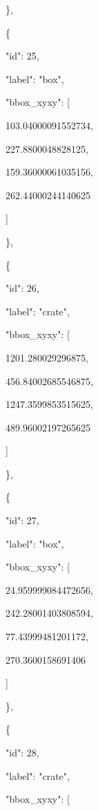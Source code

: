 \documentclass[10pt,a4paper]{article}
\begin{document}
    \},\allowbreak{}\par
    \{\par
      "id":\allowbreak{} 25,\allowbreak{}\par
      "label":\allowbreak{} "box",\allowbreak{}\par
      "bbox\_xyxy":\allowbreak{} [\par
        103.04000091552734,\allowbreak{}\par
        227.8800048828125,\allowbreak{}\par
        159.36000061035156,\allowbreak{}\par
        262.44000244140625\par
      ]\par
    \},\allowbreak{}\par
    \{\par
      "id":\allowbreak{} 26,\allowbreak{}\par
      "label":\allowbreak{} "crate",\allowbreak{}\par
      "bbox\_xyxy":\allowbreak{} [\par
        1201.280029296875,\allowbreak{}\par
        456.84002685546875,\allowbreak{}\par
        1247.3599853515625,\allowbreak{}\par
        489.96002197265625\par
      ]\par
    \},\allowbreak{}\par
    \{\par
      "id":\allowbreak{} 27,\allowbreak{}\par
      "label":\allowbreak{} "box",\allowbreak{}\par
      "bbox\_xyxy":\allowbreak{} [\par
        24.959999084472656,\allowbreak{}\par
        242.28001403808594,\allowbreak{}\par
        77.43999481201172,\allowbreak{}\par
        270.3600158691406\par
      ]\par
    \},\allowbreak{}\par
    \{\par
      "id":\allowbreak{} 28,\allowbreak{}\par
      "label":\allowbreak{} "crate",\allowbreak{}\par
      "bbox\_xyxy":\allowbreak{} [\par
\end{document}
